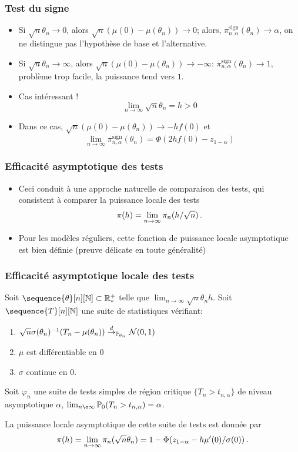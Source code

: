 \begin{frame}
\frametitle{Test du signe}
\begin{itemize}
\item Si $\sqrt{n} \theta_n \to 0$, alors $\sqrt{n}(\mu(0)- \mu(\theta_n)) \to 0$; alors, $\pi_{n,\alpha}^{\mathrm{sign}}(\theta_n) \to \alpha$, 
on ne distingue pas l'hypothèse de base et l'alternative.
\item Si $\sqrt{n} \theta_n \to \infty$, alors $\sqrt{n}(\mu(0)- \mu(\theta_n)) \to -\infty$: $\pi_{n,\alpha}^{\mathrm{sign}}(\theta_n) \to 1$, problème \alert{trop facile}, la puissance tend vers $1$.
\item Cas intéressant ! 
\alert{
\[
\lim_{n \to \infty} \sqrt{n} \theta_n= h > 0 
\]
}
\item Dans ce cas, $\sqrt{n}(\mu(0)- \mu(\theta_n)) \to -h f(0)$ et 
\alert{
\[
\lim_{n \to \infty} \pi_{n,\alpha}^{\mathrm{sign}}(\theta_n) = \Phi(2 h f(0) - z_{1-\alpha}) 
\]
} 
\end{itemize}
\end{frame}

\begin{frame}
\frametitle{Efficacité asymptotique des tests}
\begin{itemize}
\item Ceci conduit à une approche naturelle de comparaison des tests, qui consistent à comparer la \alert{puissance locale des tests}
\alert{
\[
\pi(h)= \lim_{n \to \infty} \pi_n( h / \sqrt{n}) \,.
\]
}
\item Pour les modèles réguliers, cette fonction de \alert{puissance locale asymptotique} est bien définie (preuve délicate en toute généralité)
\end{itemize}
\end{frame}

\begin{frame}
\frametitle{Efficacité asymptotique locale des tests}
\begin{theo}
Soit $\sequence{\theta}[n][\nset] \subset \rset^+_*$ telle que $\lim_{n \to \infty}\sqrt{n} \theta_n h$. 
Soit $\sequence{T}[n][\nset]$ une suite de statistiques vérifiant:  
\begin{enumerate}
\item $\sqrt{n} \sigma(\theta_n)^{-1} (T_n - \mu(\theta_n)) \stackrel{d}{\rightarrow}_{\operatorname{{\mathbb P}}_{\theta_n}} \mathcal{N}(0,1)$
\item $\mu$ est différentiable en $0$
\item $\sigma$ continue en $0$.
\end{enumerate}
Soit  $\varphi_n$ une suite de tests simples de région critique $\{ T_n > t_{n,\alpha}\}$  de niveau asymptotique $\alpha$, $\lim_{n \o \infty} \PP_{0}( T_n > t_{n,\alpha})= \alpha$. 

\bigskip 

La \alert{puissance locale asymptotique} de cette suite de tests est donnée par
\[
\pi(h)= \lim_{n \to \infty} \pi_n( \sqrt{n} \theta_n)= 1 - \Phi(z_{1-\alpha} - h \mu'(0)/\sigma(0)) \,.
\]
\end{theo}
\end{frame}

